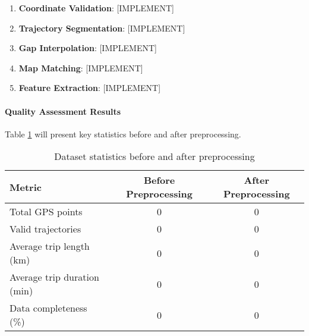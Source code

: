 \documentclass[runningheads]{llncs}
\begin{document}
\begin{enumerate}
\item \textbf{Coordinate Validation}: [IMPLEMENT]

\item \textbf{Trajectory Segmentation}: [IMPLEMENT]

\item \textbf{Gap Interpolation}: [IMPLEMENT]

\item \textbf{Map Matching}: [IMPLEMENT]

\item \textbf{Feature Extraction}: [IMPLEMENT]
\end{enumerate}

\paragraph{Quality Assessment Results}

Table \ref{tab:preprocessing-stats} will present key statistics before and after preprocessing.

\begin{table}[h]
\centering
\begin{tabular}{l|c|c}
\textbf{Metric} & \textbf{Before Preprocessing} & \textbf{After Preprocessing} \\ \hline
Total GPS points & 0 & 0 \\
Valid trajectories & 0 & 0 \\
Average trip length (km) & 0 & 0 \\
Average trip duration (min) & 0 & 0 \\
Data completeness (\%) & 0 & 0 \\
\end{tabular}
\caption{Dataset statistics before and after preprocessing}
\label{tab:preprocessing-stats}
\end{table}
\end{document}

